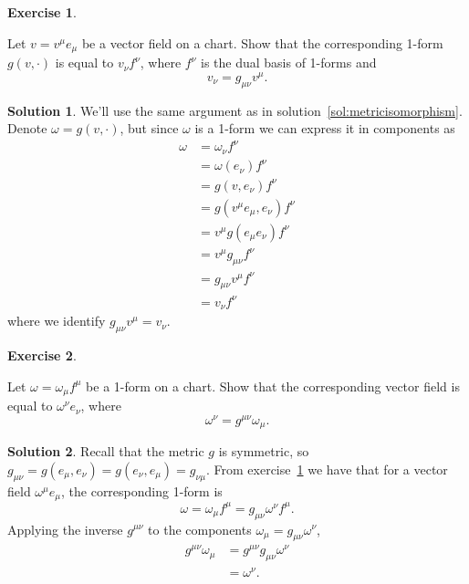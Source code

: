 \documentclass[11pt, a4paper]{report}
\theoremstyle{definition}
\newtheorem{ex}{Exercise}[part]
\newtheorem{sol}{Solution}[part]
\begin{document}
\begin{ex}\label{ex:loweringindex}

Let $v = v^\mu e_\mu$ be a vector field on a chart. Show that the corresponding 1-form $g(v, \cdot)$ is equal to $v_\nu f^\nu$, where $f^\nu$ is the dual basis of 1-forms and
\[
    v_\nu = g_{\mu\nu}v^\mu.
\]

\end{ex}

\begin{sol}

We'll use the same argument as in solution~\ref{sol:metricisomorphism}. Denote $\omega = g(v, \cdot)$, but since $\omega$ is a 1-form we can express it in components as
\begin{align*}
    \omega &= \omega_\nu f^\nu \\
           &= \omega(e_\nu) f^\nu \\
           &= g(v, e_\nu) f^\nu \\
           &= g(v^\mu e_\mu, e_\nu) f^\nu \\
           &= v^\mu g(e_\mu e_\nu) f^\nu \\
           &= v^\mu g_{\mu\nu} f^\nu \\
           &= g_{\mu\nu} v^\mu f^\nu \\
           &= v_\nu f^\nu
\end{align*}
where we identify $g_{\mu\nu}v^\mu = v_\nu$.

\end{sol}

\begin{ex}\label{ex:raisingindex}

Let $\omega = \omega_\mu f^\mu$ be a 1-form on a chart. Show that the corresponding vector field is equal to $\omega^\nu e_\nu$, where
\[
    \omega^\nu = g^{\mu\nu} \omega_\mu.
\]

\end{ex}

\begin{sol}

Recall that the metric $g$ is symmetric, so $g_{\mu\nu} = g(e_\mu, e_\nu) = g(e_\nu, e_\mu) = g_{\nu\mu}$.
From exercise~\ref{ex:loweringindex} we have that for a vector field $\omega^\mu e_\mu$, the corresponding 1-form is
\[
    \omega = \omega_\mu f^\mu = g_{\mu\nu}\omega^\nu f^\mu.
\]
Applying the inverse $g^{\mu\nu}$ to the components $\omega_\mu = g_{\mu\nu}\omega^\nu$,
\begin{align*}
    g^{\mu\nu} \omega_\mu &= g^{\mu\nu} g_{\mu\nu} \omega^\nu \\
                          &= \omega^\nu.
\end{align*}

\end{sol}
\end{document}
